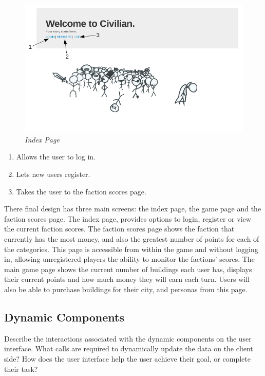 \documentclass{sig-alt-release2}
\begin{document}
\begin{figure}[!htbp]
  \caption{\textit{Index Page}}
  \begin{center}
		\includegraphics[scale=0.30]{img/indexlabel.png}
  \end{center}
\end{figure}

\begin{enumerate}
\item Allows the user to log in.
\item Lets new users register.
\item Takes the user to the faction scores page.
\end{enumerate}

There final design has three main screens: the index page, the game page and the faction scores page. The index  page, provides options to login, register or view the current faction scores. The faction scores page shows the faction that currently has the most money, and also the greatest number of points for each of the categories. This page is accessible from within the game and without logging in, allowing unregistered players the ability to monitor the factions' scores. The main game page shows the current number of buildings each user has, displays their current points and how much money they will earn each turn. Users will also be able to purchase buildings for their city, and personas from this page. 

\subsection{Dynamic Components}

Describe the interactions associated with the dynamic components on the user interface.
What calls are required to dynamically update the data on the client side?
How does the user interface help the user achieve their goal, or complete their task? 
\end{document}
